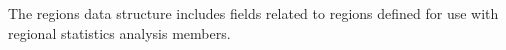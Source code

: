 The regions data structure includes fields related to regions defined for use with regional statistics analysis members.

